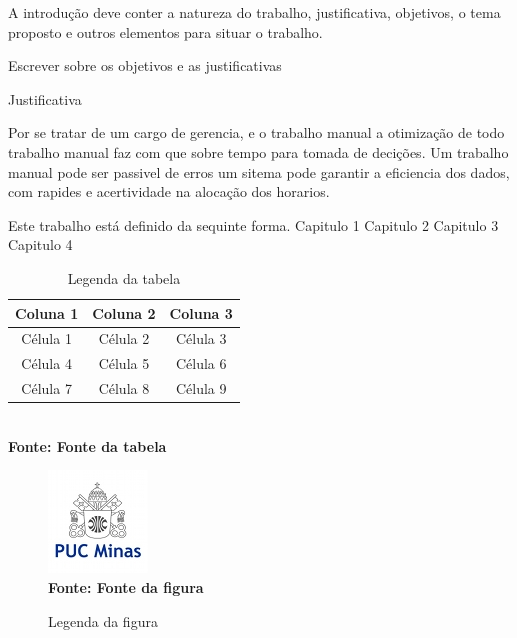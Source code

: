 
\iniciocapitulo
A introdução deve conter a natureza do trabalho, justificativa, objetivos, o tema proposto e outros elementos para situar o trabalho.\par

Escrever sobre os objetivos e as justificativas



Justificativa


	Por se tratar de um cargo de gerencia, e o trabalho manual a otimização de todo trabalho manual faz com que sobre tempo para tomada de decições. Um trabalho manual pode ser passivel de erros um sitema pode garantir a eficiencia dos dados, com rapides e acertividade na alocação dos horarios.




Este trabalho está definido da sequinte forma. Capitulo 1 Capitulo 2 Capitulo 3 Capitulo 4 


\begin{table}[!htb]
	\caption[Descrição na Lista de Tabelas]{Legenda da tabela}
	\centering
	\label{tab:tabela}
	\begin{tabular}{c|c|c}
		\hline
		Coluna 1 & Coluna 2 & Coluna 3 \\
		\hline
 		Célula 1 & Célula 2 & Célula 3 \\
		Célula 4 & Célula 5 & Célula 6 \\
		Célula 7 & Célula 8 & Célula 9 \\
		\hline
	\end{tabular}
	\\ \textbf{\footnotesize Fonte: Fonte da tabela}
\end{table}


\begin{figure}[!htb]
   \caption[Descrição na Lista de Figuras]{Legenda da figura}
   \label{fig:figura1}
   \centering
   \includegraphics{LogoPUC.jpg}
   \\ \textbf{\footnotesize Fonte: Fonte da figura}
\end{figure}
